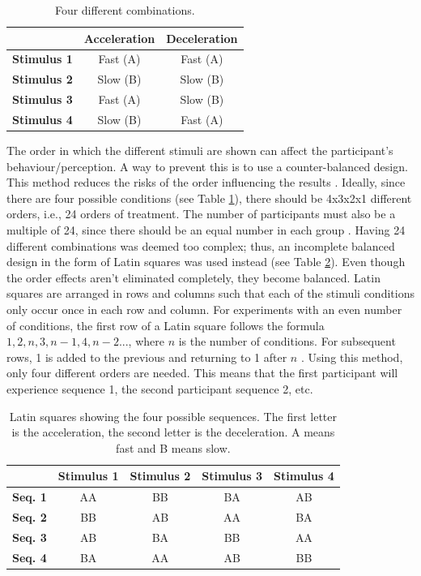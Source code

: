 \begin{table} \centering
\caption{Four different combinations.}
\label{tab:combinations}
\begin{tabular}{ccc}
\toprule
& \textbf{Acceleration} & \textbf{Deceleration} \\
\midrule
\textbf{Stimulus 1} & Fast (A) & Fast (A)\\
\textbf{Stimulus 2} & Slow (B) & Slow (B)\\
\textbf{Stimulus 3} & Fast (A) & Slow (B)\\
\textbf{Stimulus 4} & Slow (B) & Fast (A)\\
\bottomrule
\end{tabular}
\end{table}

The order in which the different stimuli are shown can affect the participant's behaviour/perception. A way to prevent this is to use a counter-balanced design. This method reduces the risks of the order influencing the results \cite{experimental2}. Ideally, since there are four possible conditions (see Table \ref{tab:combinations}), there should be 4x3x2x1 different orders, i.e., 24 orders of treatment. The number of participants must also be a multiple of 24, since there should be an equal number in each group \cite{experimental2}. Having 24 different combinations was deemed too complex; thus, an incomplete balanced design in the form of Latin squares was used instead (see Table \ref{table:latin}). Even though the order effects aren't eliminated completely, they become balanced. Latin squares are arranged in rows and columns such that each of the stimuli conditions only occur once in each row and column. For experiments with an even number of conditions, the first row of a Latin square follows the formula $1, 2, n, 3, n-1, 4, n-2...$, where $n$ is the number of conditions. For subsequent rows, 1 is added to the previous and returning to 1 after $n$ \cite{experimental2}. Using this method, only four different orders are needed. This means that the first participant will experience sequence 1, the second participant sequence 2, etc.

\begin{table} \centering
\scriptsize
\caption{Latin squares showing the four possible sequences. The first letter is the acceleration, the second letter is the deceleration. A means fast and B means slow.}
\label{table:latin}
\begin{tabular}{ccccc}
\toprule
& \textbf{Stimulus 1} & \textbf{Stimulus 2} & \textbf{Stimulus 3} & \textbf{Stimulus 4}\\
\midrule
\textbf{Seq. 1} & AA & BB & BA & AB\\
\textbf{Seq. 2} & BB & AB & AA & BA\\
\textbf{Seq. 3} & AB & BA & BB & AA\\
\textbf{Seq. 4} & BA & AA & AB & BB\\
\bottomrule
\end{tabular}
\end{table}

